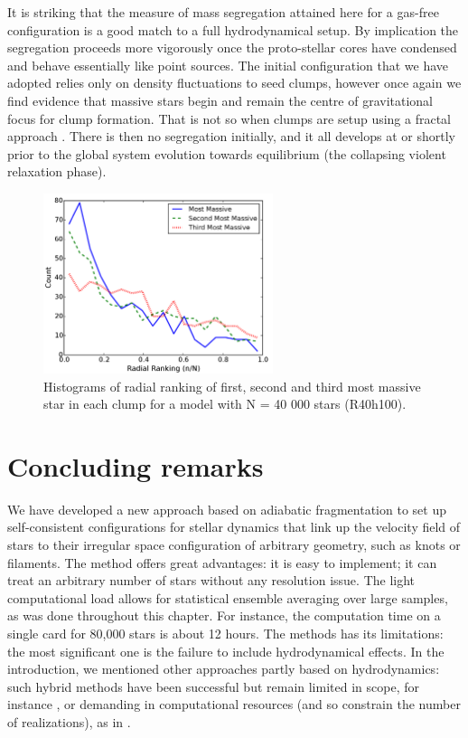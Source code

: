 It is striking that the measure of mass segregation attained here for a gas-free configuration is a good match to a full hydrodynamical setup. By implication the segregation proceeds more vigorously once the proto-stellar cores have condensed and behave essentially like point sources. The initial configuration that we have adopted relies only on density fluctuations to seed clumps, however once again we find evidence that massive stars begin and remain the centre of gravitational focus for clump formation. That is not so when clumps are setup using a fractal approach \citep{Goodwin2004,Allison2009}. There is then no segregation initially, and it all develops at or shortly prior to the global system evolution towards equilibrium (the collapsing violent relaxation phase). 


\begin{figure}
\begin{center}
\includegraphics[width=0.6\textwidth]{Figures/2_ClumpSeg}
\caption{Histograms of radial ranking of first, second and third most massive star in each clump for a model with N = 40 000 stars (R40h100).}
\label{Fig:2_ClumpSeg}
\end{center}
\end{figure}







\section{Concluding remarks}
\label{Sec:2_conclusion}

We have developed a new approach based on adiabatic fragmentation to set up self-consistent configurations for stellar dynamics that link up the velocity field of stars to their irregular space configuration of arbitrary geometry, such as knots or filaments. The method offers great advantages: it is easy to implement; it can treat an arbitrary number of stars without any resolution issue. The light computational load allows for statistical ensemble averaging over large samples, as was done throughout this chapter. For instance, the computation time on a single card for 80,000 stars is about 12 hours. The methods has its limitations: the most significant one is the failure to include hydrodynamical effects. In the introduction, we mentioned other approaches partly based on hydrodynamics: such hybrid methods have been successful but remain limited in scope, for instance \cite{Moeckel2012}, or demanding in computational resources (and so constrain the number of realizations), as in \cite{Fujii2016}. 

